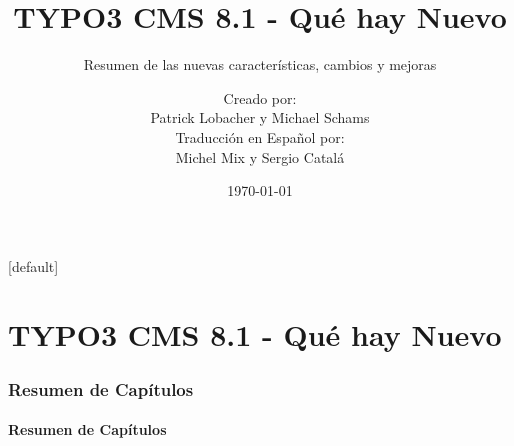 \documentclass[t]{beamer}
\title{TYPO3 CMS 8.1 - Qué hay Nuevo}
\subtitle{Resumen de las nuevas características, cambios y mejoras}
\author{
	\centerline{Creado por:}
	\centerline{Patrick Lobacher y Michael Schams}
	\vspace{0.4cm}
	\centerline{Traducción en Español por:}
	\centerline{Michel Mix y Sergio Catalá}
}
\date{\today}
\begin{document}
\sharefont


\begingroup
	[default]
	\begin{frame}
		\titlepage
	\end{frame}
\endgroup


\section*{TYPO3 CMS 8.1 - Qué hay Nuevo}
\begin{frame}[fragile]
	\frametitle{Resumen de Capítulos}
	\framesubtitle{Resumen de Capítulos}

	\tableofcontents

\end{frame}










\end{document}
